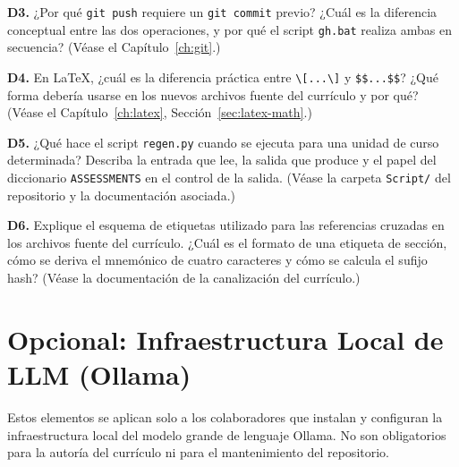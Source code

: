 \begin{Form}
\vs

\noindent\textbf{D3.} ¿Por qué \texttt{git push} requiere un
\texttt{git commit} previo? ¿Cuál es la diferencia conceptual entre
las dos operaciones, y por qué el script \texttt{gh.bat} realiza
ambas en secuencia?
(Véase el Capítulo~\ref{ch:git}.)\\[4pt]
\TextField[name=d3,width=\linewidth,height=2.5cm,multiline=true,
           bordercolor=black]{}

\vs

\noindent\textbf{D4.} En \LaTeX{}, ¿cuál es la diferencia práctica
entre \verb|\[...\]| y \verb|$$...$$|? ¿Qué forma debería usarse en
los nuevos archivos fuente del currículo y por qué?
(Véase el Capítulo~\ref{ch:latex}, Sección~\ref{sec:latex-math}.)\\[4pt]
\TextField[name=d4,width=\linewidth,height=2.5cm,multiline=true,
           bordercolor=black]{}

\vs

\noindent\textbf{D5.} ¿Qué hace el script \texttt{regen.py} cuando se
ejecuta para una unidad de curso determinada? Describa la entrada
que lee, la salida que produce y el papel del diccionario
\texttt{ASSESSMENTS} en el control de la salida.
(Véase la carpeta \texttt{Script/} del repositorio y la documentación
asociada.)\\[4pt]
\TextField[name=d5,width=\linewidth,height=2.5cm,multiline=true,
           bordercolor=black]{}

\vs

\noindent\textbf{D6.} Explique el esquema de etiquetas utilizado para
las referencias cruzadas en los archivos fuente del currículo. ¿Cuál
es el formato de una etiqueta de sección, cómo se deriva el mnemónico
de cuatro caracteres y cómo se calcula el sufijo hash?
(Véase la documentación de la canalización del currículo.)\\[4pt]
\TextField[name=d6,width=\linewidth,height=2.5cm,multiline=true,
           bordercolor=black]{}

\section{Opcional: Infraestructura Local de LLM (Ollama)}
\label{sec:assess-optional}

Estos elementos se aplican solo a los colaboradores que instalan y
configuran la infraestructura local del modelo grande de lenguaje
Ollama. No son obligatorios para la autoría del currículo ni para el
mantenimiento del repositorio.


\end{Form}
